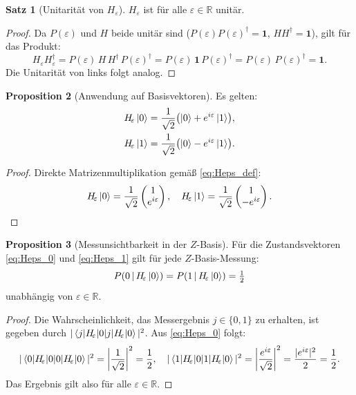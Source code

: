 ﻿\documentclass[11pt,a4paper]{article}
\theoremstyle{definition}
\newtheorem{theorem}{Satz}[section]
\newtheorem{proposition}[theorem]{Proposition}
\newcommand{\eps}{\varepsilon}
\newcommand{\Heps}{H_{\!\varepsilon}}
\newcommand{\R}{\mathbb{R}}
\begin{document}
\begin{theorem}[Unitarität von $\Heps$]
\label{thm:unitary}
  $\Heps$ ist für alle $\eps\in\R$ unitär.
\end{theorem}

\begin{proof}
  Da $P(\eps)$ und $H$ beide unitär sind ($P(\eps)P(\eps)^\dagger = \mathbf{1}$,
  $HH^\dagger = \mathbf{1}$), gilt für das Produkt:
  \[
    \Heps\Heps^\dagger = P(\eps)\,H\,H^\dagger\,P(\eps)^\dagger
    = P(\eps)\,\mathbf{1}\,P(\eps)^\dagger = P(\eps)\,P(\eps)^\dagger = \mathbf{1}.
  \]
  Die Unitarität von links folgt analog.
\end{proof}

\begin{proposition}[Anwendung auf Basisvektoren]
\label{prop:basis_action}
  Es gelten:
  \begin{align}
    \Heps\ket{0} &= \frac{1}{\sqrt{2}}\bigl(\ket{0} + e^{i\eps}\ket{1}\bigr),
    \label{eq:Heps_0} \\
    \Heps\ket{1} &= \frac{1}{\sqrt{2}}\bigl(\ket{0} - e^{i\eps}\ket{1}\bigr).
    \label{eq:Heps_1}
  \end{align}
\end{proposition}

\begin{proof}
  Direkte Matrizenmultiplikation gemäß \eqref{eq:Heps_def}:
  \[
    \Heps\ket{0} = \frac{1}{\sqrt{2}}\begin{pmatrix}1\\e^{i\eps}\end{pmatrix}, \quad
    \Heps\ket{1} = \frac{1}{\sqrt{2}}\begin{pmatrix}1\\-e^{i\eps}\end{pmatrix}.
  \]
\end{proof}

\begin{proposition}[Messunsichtbarkeit in der $Z$-Basis]
\label{prop:z_blind}
  Für die Zustandsvektoren \eqref{eq:Heps_0} und \eqref{eq:Heps_1} gilt für
  jede $Z$-Basis-Messung:
  \[
    P(0\,|\,\Heps\ket{0}) = P(1\,|\,\Heps\ket{0}) = \tfrac{1}{2}
  \]
  unabhängig von $\eps\in\R$.
\end{proposition}

\begin{proof}
  Die Wahrscheinlichkeit, das Messergebnis $j\in\{0,1\}$ zu erhalten, ist
  gegeben durch $|\braket{j|\Heps|0}|^2$.  Aus \eqref{eq:Heps_0} folgt:
  \[
    |\braket{0|\Heps|0}|^2 = \left|\frac{1}{\sqrt{2}}\right|^2 = \frac{1}{2}, \quad
    |\braket{1|\Heps|0}|^2 = \left|\frac{e^{i\eps}}{\sqrt{2}}\right|^2
    = \frac{|e^{i\eps}|^2}{2} = \frac{1}{2}.
  \]
  Das Ergebnis gilt also für alle $\eps\in\R$.
\end{proof}
\end{document}
